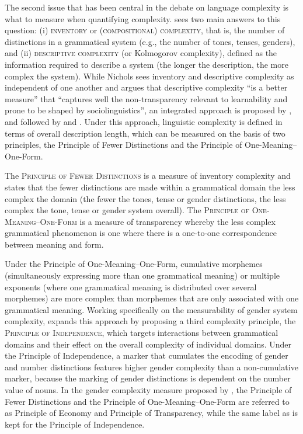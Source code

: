 \documentclass[output=collectionpaper]{langsci/langscibook}
\begin{document}
The second issue that has been central in the debate on language complexity is what to measure when quantifying complexity.  sees two main answers to this question: (i) \textsc{inventory} or \textsc{(compositional) complexity}, that is, the number of distinctions in a grammatical system (e.g., the number of tones, tenses, genders), and (ii) \textsc{descriptive complexity} (or Kolmogorov complexity), defined as the information required to describe a system (the longer the description, the more complex the system). While Nichols sees inventory and descriptive complexity as independent of one another and argues that descriptive complexity ``is a better measure'' that ``captures well the non-transparency relevant to learnability and prone to be shaped by sociolinguistics'', an integrated approach is proposed by \citet{Miestamo2008}, and followed by  and . Under this approach, linguistic complexity is defined in terms of overall description length, which can be measured on the basis of two principles, the Principle of Fewer Distinctions and the Principle of One-Meaning--One-Form.

The \textsc{Principle of Fewer Distinctions} is a measure of inventory complexity and states that the fewer distinctions are made within a grammatical domain the less complex the domain (the fewer the tones, tense or gender distinctions, the less complex the tone, tense or gender system overall). The \textsc{Principle of One-Meaning--One-Form} is a measure of transparency whereby the less complex grammatical phenomenon is one where there is a one-to-one correspondence between meaning and form.

Under the Principle of One-Meaning--One-Form, cumulative morphemes (simultaneously expressing more than one grammatical meaning) or multiple exponents (where one grammatical meaning is distributed over several morphemes) are more complex than morphemes that are only associated with one grammatical meaning. Working specifically on the measurability of gender system complexity, \citet{DiGarbo2014,DiGarbo2016} expands this approach by proposing a third complexity principle, the \textsc{Principle of Independence}, which targets interactions between grammatical domains and their effect on the overall complexity of individual domains. Under the Principle of Independence, a marker that cumulates the encoding of gender and number distinctions features higher gender complexity than a non-cumulative marker, because the marking of gender distinctions is dependent on the number value of nouns. In the gender complexity measure proposed by , the Principle of Fewer Distinctions and the Principle of One-Meaning--One-Form are referred to as Principle of Economy and Principle of Transparency, while the same label as \citet{DiGarbo2014,DiGarbo2016} is kept for the Principle of Independence.
\end{document}
